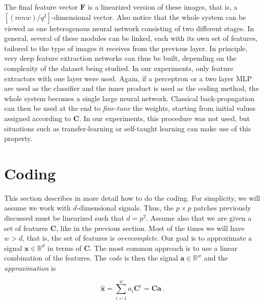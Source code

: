 \documentclass[runningheads,a4paper]{llncs}
\newcommand{\hctimes}[2]{{#1}\!\times\!{#2}}
\newcommand{\hcsignalspace}{\mathbb{R}^d}
\newcommand{\hcweightspace}{\mathbb{R}^w}
\begin{document}
The final feature vector $\textbf{F}$ is a linearized version of these images, that is, a $\left[(mnw) / q^2\right]$-dimensional vector. Also notice that the whole system can be viewed as one heterogenous neural network consisting of two different stages. In general, several of these modules can be linked, each with its own set of features, tailored to the type of images it receives from the previous layer. In principle, very deep feature extraction networks can thus be built, depending on the complexity of the dataset being studied. In our experiments, only feature extractors with one layer were used. Again, if a perceptron or a two layer MLP are used as the classifier and the inner product is used as the coding method, the whole system becomes a single large neural network. Classical back-propagation can then be used at the end to \emph{fine-tune} the weights, starting from initial values assigned according  to $\textbf{C}$. In our experiments, this procedure was not used, but situations such as transfer-learning or self-taught learning \cite{self-taught-learning} can make use of this property.

\section{Coding}

This section describes in more detail how to do the coding. For simplicity, we will assume we work with $d$-dimensional signals. Thus, the $\hctimes{p}{p}$ patches previously discussed must be linearized such that $d = p^2$. Assume also that we are given a set of features $\textbf{C}$, like in the previous section. Most of the times we will have $w > d$, that is, the set of features is \emph{overcomplete}. Our goal is to approximate a signal $\textbf{x} \in \hcsignalspace$ in terms of $\textbf{C}$. The most common approach is to use a linear combination of the features. The \emph{code} is then the signal $\textbf{a} \in \hcweightspace$ and the \emph{approximation} is

\begin{equation}
\hat{\textbf{x}} = \sum_{i=1}^w {a_i \textbf{C}^i} = \textbf{C}\textbf{a}~.
\end{equation}
\end{document}
